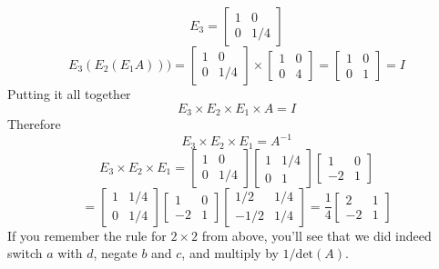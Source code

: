 \documentclass[11pt, oneside]{article}
\begin{document}
\[ E_3 =
\begin{bmatrix}
1 & 0 \\
0 & 1/4
 \end{bmatrix}
\]
\[
E_3(E_2(E_1 A))) =
\begin{bmatrix}
1 & 0 \\
0 & 1/4
 \end{bmatrix}
\times
\begin{bmatrix}
1 & 0 \\
0 & 4
 \end{bmatrix}
 =
\begin{bmatrix}
1 & 0 \\
0 & 1
 \end{bmatrix}
 =
 I
\]
Putting it all together
\[ E_3 \times E_2 \times E_1 \times A = I \]
Therefore
\[ E_3 \times E_2 \times E_1 = A^{-1} \]
\[ E_3 \times E_2 \times E_1 = 
\begin{bmatrix}
1 & 0 \\
0 & 1/4
\end{bmatrix}
\begin{bmatrix}
1 & 1/4 \\
0 & 1
 \end{bmatrix}
\begin{bmatrix}
1 & 0 \\
-2 & 1
 \end{bmatrix}
 \]
 \[
=
\begin{bmatrix}
1 & 1/4 \\
0 & 1/4
 \end{bmatrix}
\begin{bmatrix}
1 & 0 \\
-2 & 1
 \end{bmatrix}
\begin{bmatrix}
1/2 & 1/4 \\
-1/2 & 1/4
 \end{bmatrix}
 = \frac{1}{4}
\begin{bmatrix}
2 & 1 \\
-2 & 1
 \end{bmatrix}
\]
If you remember the rule for $2 \times 2$ from above, you'll see that we did indeed switch $a$ with $d$, negate $b$ and $c$, and multiply by $1/\text{det}(A)$.
\end{document}
